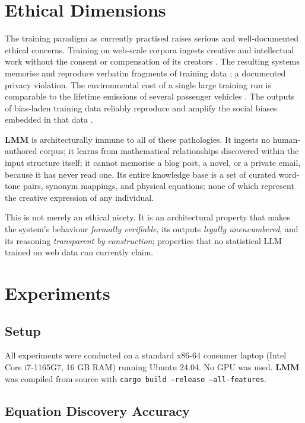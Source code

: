 \documentclass[11pt,a4paper]{article}
\newcommand{\lmm}{\texorpdfstring{%
  \textbf{\color{lmmAccent}LMM}}{LMM}}
\begin{document}
\section{Ethical Dimensions}
\label{sec:ethics}

The training paradigm as currently practised raises serious and well-documented ethical concerns. Training on web-scale corpora ingests creative and intellectual work without the consent or compensation of its creators \citep{grynbaum2023nyt,COPYRIGHT_AI_REPORT_2025}. The resulting systems memorise and reproduce verbatim fragments of training data \citep{ippolito2022}; a documented privacy violation. The environmental cost of a single large training run is comparable to the lifetime emissions of several passenger vehicles \citep{strubell2019energy}. The outputs of bias-laden training data reliably reproduce and amplify the social biases embedded in that data \citep{gallegos2023bias}.

\lmm{} is architecturally immune to all of these pathologies. It ingests no human-authored corpus; it learns from mathematical relationships discovered within the input structure itself; it cannot memorise a blog post, a novel, or a private email, because it has never read one. Its entire knowledge base is a set of curated word-tone pairs, synonym mappings, and physical equations; none of which represent the creative expression of any individual.

This is not merely an ethical nicety. It is an architectural property that makes the system's behaviour \emph{formally verifiable}, its outputs \emph{legally unencumbered}, and its reasoning \emph{transparent by construction}; properties that no statistical LLM trained on web data can currently claim.

\section{Experiments}
\label{sec:experiments}

\subsection{Setup}

All experiments were conducted on a standard x86-64 consumer laptop (Intel Core i7-1165G7, 16 GB RAM) running Ubuntu 24.04. No GPU was used. \lmm{} was compiled from source with \texttt{cargo build --release --all-features}.

\subsection{Equation Discovery Accuracy}
\end{document}
